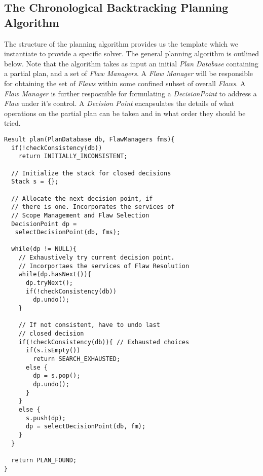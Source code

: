 \documentclass[10pt, letterpaper, oneside]{article}
\begin{document}
\subsection{The Chronological Backtracking Planning Algorithm}
The structure of the planning algorithm provides us the template which we instantiate to provide a specific solver. The general planning algorithm is outlined below. Note that the algorithm takes as input an initial {\em Plan Database} containing a partial plan, and a set of {\em Flaw Managers}. A {\em Flaw Manager} will be responsible for obtaining the set of {\em Flaws} within some confined subset of overall {\em Flaws}. A {\em Flaw Manager} is further resposnible for formulating a {\em DecisionPoint} to address a {\em Flaw} under it's control. A {\em Decision Point} encapsulates the details of what operations on the partial plan can be taken and in what order they should be tried.
\begin{verbatim}
Result plan(PlanDatabase db, FlawManagers fms){
  if(!checkConsistency(db))
    return INITIALLY_INCONSISTENT;

  // Initialize the stack for closed decisions
  Stack s = {};

  // Allocate the next decision point, if
  // there is one. Incorporates the services of
  // Scope Management and Flaw Selection
  DecisionPoint dp = 
   selectDecisionPoint(db, fms);

  while(dp != NULL){
    // Exhaustively try current decision point.
    // Incorportaes the services of Flaw Resolution
    while(dp.hasNext()){
      dp.tryNext();
      if(!checkConsistency(db))
        dp.undo();
    }

    // If not consistent, have to undo last
    // closed decision
    if(!checkConsistency(db)){ // Exhausted choices
      if(s.isEmpty())
        return SEARCH_EXHAUSTED;
      else {
        dp = s.pop();
        dp.undo();
      }
    }
    else {
      s.push(dp);
      dp = selectDecisionPoint(db, fm);
    }
  }

  return PLAN_FOUND;
}
\end{verbatim}
\end{document}

